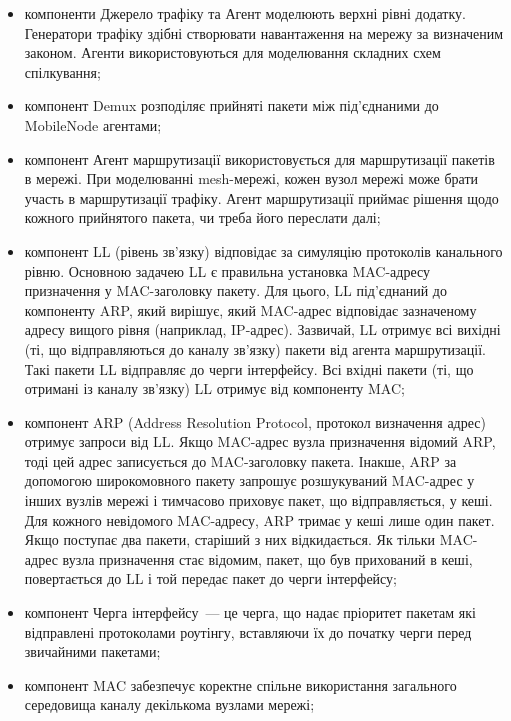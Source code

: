 \documentclass[a4paper,ukrainian,utf8,nocolumnsxix,floatsection,equationsection]{eskdtext}
\begin{document}
\begin{itemize}
	\item компоненти Джерело трафіку та Агент моделюють верхні рівні додатку. Генератори трафіку здібні створювати навантаження на мережу за визначеним законом. Агенти використовуються для моделювання складних схем спілкування;

	\item компонент Demux розподіляє прийняті пакети між під'єднаними до MobileNode агентами;

	\item компонент Агент маршрутизації використовується для маршрутизації пакетів в мережі. При моделюванні mesh-мережі, кожен вузол мережі може брати участь в маршрутизації трафіку. Агент маршрутизації приймає рішення щодо кожного прийнятого пакета, чи треба його переслати далі;

	\item компонент LL (рівень зв'язку) відповідає за симуляцію протоколів канального рівню. Основною задачею LL є правильна установка MAC-адресу призначення у MAC-заголовку пакету. Для цього, LL під’єднаний до компоненту ARP, який вирішує, який MAC-адрес відповідає зазначеному адресу вищого рівня (наприклад, IP-адрес). Зазвичай, LL отримує всі вихідні (ті, що відправляються до каналу зв'язку) пакети від агента маршрутизації. Такі пакети LL відправляє до черги інтерфейсу. Всі вхідні пакети (ті, що отримані із каналу зв'язку) LL отримує від компоненту MAC;

	\item компонент ARP (Address Resolution Protocol, протокол визначення адрес) отримує запроси від LL. Якщо MAC-адрес вузла призначення відомий ARP, тоді цей адрес записується до MAC-заголовку пакета. Інакше, ARP за допомогою широкомовного пакету запрошує розшукуваний MAC-адрес у інших вузлів мережі і тимчасово приховує пакет, що відправляється, у кеші. Для кожного невідомого MAC-адресу, ARP тримає у кеші лише один пакет. Якщо поступає два пакети, старіший з них відкидається. Як тільки MAC-адрес вузла призначення стає відомим, пакет, що був прихований в кеші, повертається до LL і той передає пакет до черги інтерфейсу;

	\item компонент Черга інтерфейсу~--- це черга, що надає пріоритет пакетам які відправлені протоколами роутінгу, вставляючи їх до початку черги перед звичайними пакетами;

	\item компонент MAC забезпечує коректне спільне використання загального середовища каналу декількома вузлами мережі; 


\end{itemize}
\end{document}
